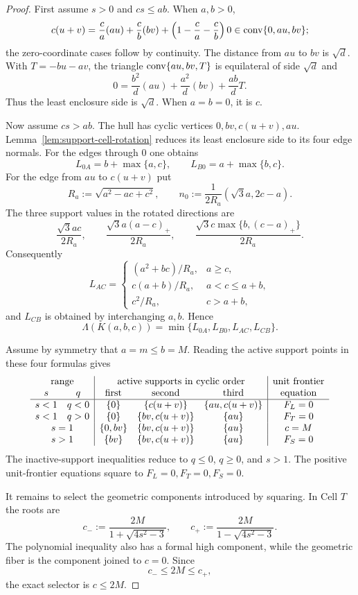 \begin{proof}
First assume $s>0$ and $cs\le ab$.  When $a,b>0$,
\[
 c(u+v)=\frac ca(au)+\frac cb(bv)
       +\left(1-\frac ca-\frac cb\right)0
 \in\mathrm{conv}\{0,au,bv\};
\]
the zero-coordinate cases follow by continuity.  The distance from $au$ to
$bv$ is $\sqrt d$.  With $T=-bu-av$, the triangle
$\mathrm{conv}\{au,bv,T\}$ is equilateral of side $\sqrt d$ and
\[
 0=\frac{b^2}{d}(au)+\frac{a^2}{d}(bv)+\frac{ab}{d}T.
\]
Thus the least enclosure side is $\sqrt d$.  When $a=b=0$, it is $c$.

Now assume $cs>ab$.  The hull has cyclic vertices $0,bv,c(u+v),au$.
Lemma~\ref{lem:support-cell-rotation} reduces its least enclosure side
to its four edge normals.  For the edges through $0$ one obtains
\[
 L_{0A}=b+\max\{a,c\},
 \qquad L_{B0}=a+\max\{b,c\}.
\]
For the edge from $au$ to $c(u+v)$ put
\[
 R_a:=\sqrt{a^2-ac+c^2},
 \qquad n_0:=\frac1{2R_a}(\sqrt3a,2c-a).
\]
The three support values in the rotated directions are
\[
 \frac{\sqrt3ac}{2R_a},\qquad
 \frac{\sqrt3a(a-c)_+}{2R_a},\qquad
 \frac{\sqrt3c\max\{b,(c-a)_+\}}{2R_a}.
\]
Consequently
\[
 L_{AC}=
 \begin{cases}
 (a^2+bc)/R_a,&a\ge c,\\
 c(a+b)/R_a,&a<c\le a+b,\\
 c^2/R_a,&c>a+b,
 \end{cases}
\]
and $L_{CB}$ is obtained by interchanging $a,b$.  Hence
\[
 \Lambda(K(a,b,c))
 =\min\{L_{0A},L_{B0},L_{AC},L_{CB}\}.
\]

Assume by symmetry that $a=m\le b=M$.  Reading the active support points in
these four formulas gives
\[
\begin{array}{cc|ccc|c}
\multicolumn{2}{c|}{\text{range}}
 &\multicolumn{3}{c|}{\text{active supports in cyclic order}}
 &\text{unit frontier}\\
s&q&\text{first}&\text{second}&\text{third}&\text{equation}\\
\hline
s<1&q<0&\{0\}&\{c(u+v)\}&\{au,c(u+v)\}&F_L=0\\
s<1&q>0&\{0\}&\{bv,c(u+v)\}&\{au\}&F_T=0\\
\multicolumn{2}{c|}{s=1}&\{0,bv\}&\{bv,c(u+v)\}&\{au\}&c=M\\
\multicolumn{2}{c|}{s>1}&\{bv\}&\{bv,c(u+v)\}&\{au\}&F_S=0
\end{array}
\]
The inactive-support inequalities reduce to $q\le0$, $q\ge0$, and $s>1$.
The positive unit-frontier equations square to $F_L=0,F_T=0,F_S=0$.

It remains to select the geometric components introduced by squaring.  In
Cell $T$ the roots are
\[
 c_-:=\frac{2M}{1+\sqrt{4s^2-3}},
 \qquad
 c_+:=\frac{2M}{1-\sqrt{4s^2-3}}.
\]
The polynomial inequality also has a formal high component, while the
geometric fiber is the component joined to $c=0$.  Since
\[
 c_-\le2M\le c_+,
\]
the exact selector is $c\le2M$.


\end{proof}
